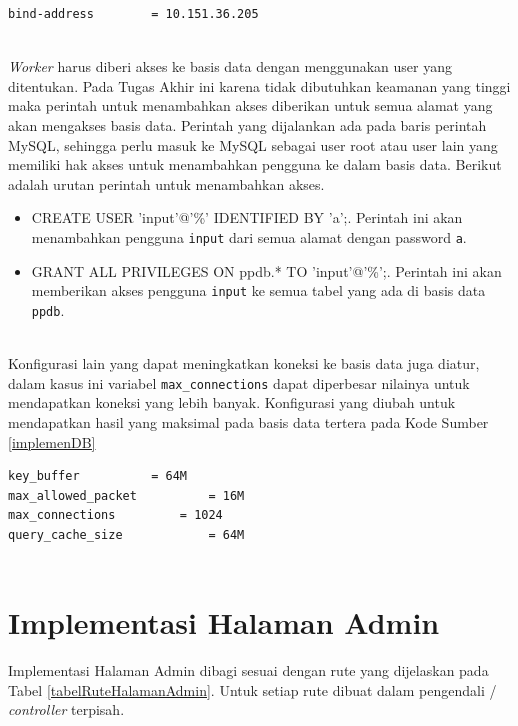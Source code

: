 \documentclass{ta-its}
\begin{document}
			\begin{lstlisting}[frame=single,tabsize=2,breaklines,caption={Konfigurasi MySQL pada Alamat IP AJK},label=alamatDB]
bind-address		= 10.151.36.205
			
			\end{lstlisting}
			
			\textit{Worker} harus diberi akses ke basis data dengan menggunakan user yang ditentukan. Pada Tugas Akhir ini karena tidak dibutuhkan keamanan yang tinggi maka perintah untuk menambahkan akses diberikan untuk semua alamat yang akan mengakses basis data. Perintah yang dijalankan ada pada baris perintah MySQL, sehingga perlu masuk ke MySQL sebagai user root atau user lain yang memiliki hak akses untuk menambahkan pengguna ke dalam basis data. Berikut adalah urutan perintah untuk menambahkan akses.
			
			\begin{itemize}
				\item CREATE USER 'input'@'\%' IDENTIFIED BY 'a';. Perintah ini akan menambahkan pengguna \texttt{input} dari semua alamat dengan password \texttt{a}.
				\item GRANT ALL PRIVILEGES ON ppdb.* TO 'input'@'\%';. Perintah ini akan memberikan akses pengguna \texttt{input} ke semua tabel yang ada di basis data \texttt{ppdb}.
			\end{itemize}
			\ \\
			
			Konfigurasi lain yang dapat meningkatkan koneksi ke basis data juga diatur, dalam kasus ini variabel \texttt{max\_connections} dapat diperbesar nilainya untuk mendapatkan koneksi yang lebih banyak. Konfigurasi yang diubah untuk mendapatkan hasil yang maksimal pada basis data tertera pada Kode Sumber \ref{implemenDB}
		    
		    \begin{lstlisting}[frame=single,tabsize=2,breaklines,caption={Konfigurasi MySQL untuk Server Basis Data},label=implemenDB]
key_buffer			= 64M
max_allowed_packet			= 16M
max_connections			= 1024
query_cache_size			= 64M
		    
		    \end{lstlisting}
		
		\section{Implementasi Halaman Admin}
			Implementasi Halaman Admin dibagi sesuai dengan rute yang dijelaskan pada Tabel \ref{tabelRuteHalamanAdmin}. Untuk setiap rute dibuat dalam pengendali / \textit{controller} terpisah.
			
\end{document}
